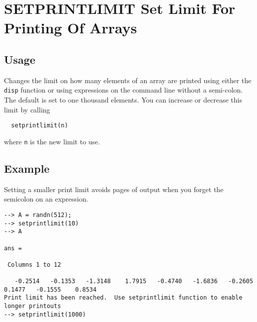 \section{SETPRINTLIMIT Set Limit For Printing Of Arrays}

\subsection{Usage}

Changes the limit on how many elements of an array are printed
using either the \verb|disp| function or using expressions on the
command line without a semi-colon.  The default is set to 
one thousand elements.  You can increase or decrease this
limit by calling
\begin{verbatim}
  setprintlimit(n)
\end{verbatim}
where \verb|n| is the new limit to use.
\subsection{Example}

Setting a smaller print limit avoids pages of output when you forget the semicolon on an expression.
\begin{verbatim}
--> A = randn(512);
--> setprintlimit(10)
--> A

ans = 

 Columns 1 to 12

   -0.2514   -0.1353   -1.3148    1.7915   -0.4740   -1.6836   -0.2605    0.1477   -0.1555    0.8534
Print limit has been reached.  Use setprintlimit function to enable longer printouts
--> setprintlimit(1000)
\end{verbatim}

